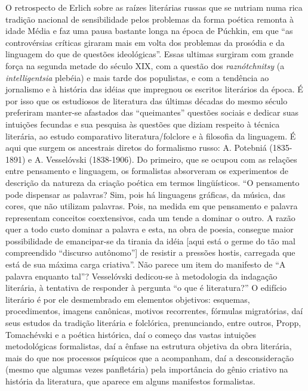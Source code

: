 O retrospecto de Erlich sobre as raízes literárias russas que se nutriam
numa rica tradição nacional de sensibilidade pelos problemas da forma
poética remonta à idade Média e faz uma pausa bastante longa na época de
Púchkin, em que ``as controvérsias críticas giraram mais em volta dos
problemas da prosódia e da linguagem do que de questões ideológicas''.
Essas ultimas surgiram com grande força na segunda metade do século XIX,
com a questão dos \emph{raznótchnitsy} (a \emph{intelligentsia} plebéia)
e mais tarde dos populistas, e com a tendência ao jornalismo e à
história das idéias que impregnou os escritos literários da época. É por
isso que os estudiosos de literatura das últimas décadas do mesmo século
preferiram manter-se afastados das ``queimantes'' questões sociais e
dedicar suas intuições fecundas e sua pesquisa às questões que diziam
respeito à técnica literária, ao estudo comparativo literatura/folclore
e à filosofia da linguagem. É aqui que surgem os ancestrais diretos do
formalismo russo: A. Potebniá (1835-1891) e A. Vesselóvski (1838-1906).
Do primeiro, que se ocupou com as relações entre pensamento e linguagem,
os formalistas absorveram os experimentos de descrição da natureza da
criação poética em termos lingüísticos. ``O pensamento pode dispensar as
palavras? Sim, pois há linguagens gráficas, da música, das cores, que
não utilizam palavras. Pois, na medida em que pensamento e palavra
representam conceitos coextensivos, cada um tende a dominar o outro. A
razão quer a todo custo dominar a palavra e esta, na obra de poesia,
consegue maior possibilidade de emancipar-se da tirania da idéia {[}aqui
está o germe do tão mal compreendido ``discurso autônomo''{]} de
resistir a pressões hostis, carregada que está de sua máxima carga
criativa''. Não parece um item do manifesto de ``A palavra enquanto
tal''? Vesselóvski dedicou-se à metodologia da indagação literária, à
tentativa de responder à pergunta ``o que é literatura?'' O edifício
literário é por ele desmembrado em elementos objetivos: esquemas,
procedimentos, imagens canônicas, motivos recorrentes, fórmulas
migratórias, daí seus estudos da tradição literária e folclórica,
prenunciando, entre outros, Propp, Tomachévski e a poética histórica,
daí o começo das vastas intuições metodológicas formalistas, daí a
ênfase na estrutura objetiva da obra literária, mais do que nos
processos psíquicos que a acompanham, daí a desconsideração (mesmo que
algumas vezes panfletária) pela importância do gênio criativo na
história da literatura, que aparece em alguns manifestos formalistas.

